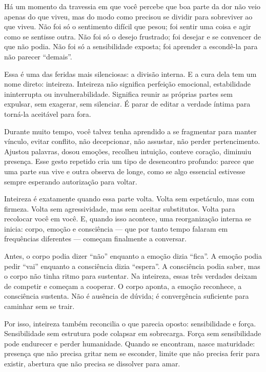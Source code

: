 \documentclass[12pt]{book}
\begin{document}
Há um momento da travessia em que você percebe que boa parte da dor não veio apenas do que viveu, mas do modo como precisou se dividir para sobreviver ao que viveu. Não foi só o sentimento difícil que pesou; foi sentir uma coisa e agir como se sentisse outra. Não foi só o desejo frustrado; foi desejar e se convencer de que não podia. Não foi só a sensibilidade exposta; foi aprender a escondê-la para não parecer “demais”.

Essa é uma das feridas mais silenciosas: a divisão interna. E a cura dela tem um nome direto: inteireza. Inteireza não significa perfeição emocional, estabilidade ininterrupta ou invulnerabilidade. Significa reunir as próprias partes sem expulsar, sem exagerar, sem silenciar. É parar de editar a verdade íntima para torná-la aceitável para fora.

Durante muito tempo, você talvez tenha aprendido a se fragmentar para manter vínculo, evitar conflito, não decepcionar, não assustar, não perder pertencimento. Ajustou palavras, dosou emoções, recolheu intuição, conteve coração, diminuiu presença. Esse gesto repetido cria um tipo de desencontro profundo: parece que uma parte sua vive e outra observa de longe, como se algo essencial estivesse sempre esperando autorização para voltar.

Inteireza é exatamente quando essa parte volta. Volta sem espetáculo, mas com firmeza. Volta sem agressividade, mas sem aceitar substitutos. Volta para recolocar você em você. E, quando isso acontece, uma reorganização interna se inicia: corpo, emoção e consciência — que por tanto tempo falaram em frequências diferentes — começam finalmente a conversar.

Antes, o corpo podia dizer “não” enquanto a emoção dizia “fica”. A emoção podia pedir “vai” enquanto a consciência dizia “espera”. A consciência podia saber, mas o corpo não tinha ritmo para sustentar. Na inteireza, essas três verdades deixam de competir e começam a cooperar. O corpo aponta, a emoção reconhece, a consciência sustenta. Não é ausência de dúvida; é convergência suficiente para caminhar sem se trair.

Por isso, inteireza também reconcilia o que parecia oposto: sensibilidade e força. Sensibilidade sem estrutura pode colapsar em sobrecarga. Força sem sensibilidade pode endurecer e perder humanidade. Quando se encontram, nasce maturidade: presença que não precisa gritar nem se esconder, limite que não precisa ferir para existir, abertura que não precisa se dissolver para amar.
\end{document}
